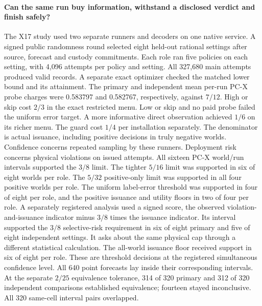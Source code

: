 \paragraph{Can the same run buy information, withstand a disclosed verdict and finish safely?}
The X17 study \citep{expx17} used two separate runners and decoders on one native service. A signed public randomness round selected eight held-out rational settings after source, forecast and custody commitments. Each role ran five policies on each setting, with 4,096 attempts per policy and setting. All 327,680 main attempts produced valid records. A separate exact optimizer checked the matched lower bound and its attainment. The primary and independent mean per-run PC-X probe charges were 0.583797 and 0.582767, respectively, against \(7/12\). High or skip cost \(2/3\) in the exact restricted menu. Low or skip and no paid probe failed the uniform error target. A more informative direct observation achieved \(1/6\) on its richer menu. The guard cost \(1/4\) per installation separately.
The denominator is actual issuance, including positive decisions in truly negative worlds. Confidence concerns repeated sampling by these runners. Deployment risk concerns physical violations on issued attempts. All sixteen PC-X world/run intervals supported the \(3/8\) limit. The tighter \(5/16\) limit was supported in six of eight worlds per role. The \(5/32\) positive-only limit was supported in all four positive worlds per role. The uniform label-error threshold was supported in four of eight per role, and the positive issuance and utility floors in two of four per role. A separately registered analysis used a signed score, the observed violation-and-issuance indicator minus \(3/8\) times the issuance indicator. Its interval supported the \(3/8\) selective-risk requirement in six of eight primary and five of eight independent settings. It asks about the same physical cap through a different statistical calculation. The all-world issuance floor received support in six of eight per role. These are threshold decisions at the registered simultaneous confidence level. All 640 point forecasts lay inside their corresponding intervals. At the separate \(2/25\) equivalence tolerance, 314 of 320 primary and 312 of 320 independent comparisons established equivalence; fourteen stayed inconclusive. All 320 same-cell interval pairs overlapped.

